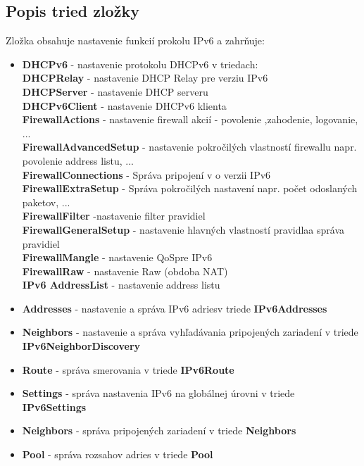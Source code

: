 \subsection{Popis tried zložky}
Zložka obsahuje nastavenie funkcií prokolu IPv6 a zahrňuje:\begin{itemize}
\item \textbf{DHCPv6} - nastavenie protokolu DHCPv6 v triedach:\\
\textbf{DHCPRelay} - nastavenie DHCP Relay pre verziu IPv6\\
\textbf{DHCPServer} - nastavenie DHCP serveru\\
\textbf{DHCPv6Client} - nastavenie DHCPv6 klienta\\
\textbf{FirewallActions} - nastavenie firewall akcií - povolenie ,zahodenie, logovanie, ...\\
\textbf{FirewallAdvancedSetup} - nastavenie pokročilých vlastností firewallu napr. povolenie address listu, ...\\
\textbf{FirewallConnections} - Správa pripojení v o verzii IPv6\\
\textbf{FirewallExtraSetup} - Správa pokročilých nastavení napr. počet odoslaných paketov, ...\\
\textbf{FirewallFilter} -nastavenie filter pravidiel \\
\textbf{FirewallGeneralSetup} - nastavenie hlavných vlastností pravidlaa správa pravidiel\\
\textbf{FirewallMangle} - nastavenie QoSpre IPv6\\
\textbf{FirewallRaw} - nastavenie Raw (obdoba NAT)\\
\textbf{IPv6 AddressList}  - nastavenie address listu
\item \textbf{Addresses} - nastavenie a správa IPv6 adriesv triede \textbf{IPv6Addresses}
\item \textbf{Neighbors} - nastavenie a správa vyhľadávania pripojených zariadení v triede \textbf{IPv6NeighborDiscovery}
\item \textbf{Route} - správa smerovania v triede \textbf{IPv6Route}
\item \textbf{Settings} - správa nastavenia IPv6 na globálnej úrovni v triede \textbf{IPv6Settings}
\item \textbf{Neighbors} - správa pripojených zariadení v triede \textbf{Neighbors}
\item \textbf{Pool} - správa rozsahov adries v triede \textbf{Pool}
\end{itemize}
